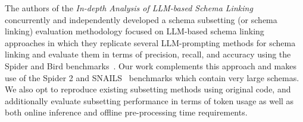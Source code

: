 The authors of the \emph{In-depth Analysis of LLM-based Schema Linking}~\cite{Katsogiannis-Meimarakis2026} concurrently and independently developed a schema subsetting (or schema linking) evaluation methodology focused on LLM-based schema linking approaches in which they replicate several LLM-prompting methods for schema linking and evaluate them in terms of precision, recall, and accuracy using the Spider and Bird benchmarks~\cite{benchmark-spider,benchmark-bird}.
Our work complements this approach and makes use of the Spider 2 and SNAILS~\cite{benchmark-spider2,benchmark-snails} benchmarks which contain very large schemas.
We also opt to reproduce existing subsetting methods using original code, and additionally evaluate subsetting performance in terms of token usage as well as both online inference and offline pre-processing time requirements. 


